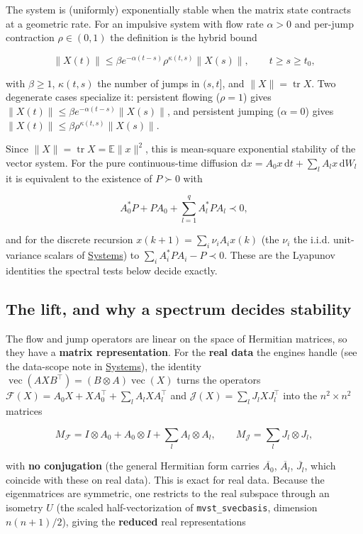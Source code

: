 \documentclass[11pt,oneside]{report}
\newcommand{\code}[1]{\texttt{#1}}
\begin{document}
The system is (uniformly) exponentially stable when the matrix state contracts
at a geometric rate. For an impulsive system with flow rate \(\alpha>0\) and
per-jump contraction \(\rho\in(0,1)\) the definition is the hybrid bound

\[\|X(t)\|\le\beta e^{-\alpha(t-s)} \rho^{ \kappa(t,s)} \|X(s)\|,\qquad t\ge s\ge t_0,\]

with \(\beta\ge1\), \(\kappa(t,s)\) the number of jumps in \((s,t]\), and
\(\|X\|=\operatorname{tr}X\). Two degenerate cases specialize it: persistent
flowing (\(\rho=1\)) gives \(\|X(t)\|\le\beta e^{-\alpha(t-s)}\|X(s)\|\), and
persistent jumping (\(\alpha=0\)) gives
\(\|X(t)\|\le\beta\rho^{\kappa(t,s)}\|X(s)\|\).

Since \(\|X\|=\operatorname{tr}X=\mathbb{E}\|x\|^{2}\), this is mean-square
exponential stability of the vector system. For the pure continuous-time
diffusion \(\mathrm{d}x=A_0x\,\mathrm{d}t+\sum_l A_l x\,\mathrm{d}W_l\) it is
equivalent to the existence of \(P\succ0\) with

\[A_0^{*}P+PA_0+\sum_{l=1}^{q}A_l^{*}P A_l\prec0,\]

and for the discrete recursion \(x(k{+}1)=\sum_i\nu_i A_i x(k)\) (the \(\nu_i\) the
i.i.d. unit-variance scalars of \protect\hyperlink{chap:02-systems}{Systems}) to
\(\sum_i A_i^{*}P A_i-P\prec0\). These are the Lyapunov identities the spectral
tests below decide exactly.

\hypertarget{the-lift-and-why-a-spectrum-decides-stability}{%
\subsection{The lift, and why a spectrum decides stability}\label{the-lift-and-why-a-spectrum-decides-stability}}

The flow and jump operators are linear on the space of Hermitian matrices, so
they have a \textbf{matrix representation}. For the \textbf{real data} the engines handle
(see the data-scope note in \protect\hyperlink{chap:02-systems}{Systems}), the identity
\(\operatorname{vec}(A X B^{\top})=(B\otimes A)\operatorname{vec}(X)\) turns the
operators \(\mathcal{F}(X)=A_0X+XA_0^{\top}+\sum_l A_l X A_l^{\top}\) and
\(\mathcal{J}(X)=\sum_l J_l X J_l^{\top}\) into the \(n^{2}\times n^{2}\) matrices

\[M_{\mathcal{F}}=I\otimes A_0+A_0\otimes I+\sum_{l}A_l\otimes A_l,\qquad M_{\mathcal{J}}=\sum_{l}J_l\otimes J_l,\]

with \textbf{no conjugation} (the general Hermitian form carries \(\overline{A_0}\),
\(\overline{A_l}\), \(\overline{J_l}\), which coincide with these on real data). This
is exact for real data. Because the eigenmatrices are symmetric, one restricts to
the real subspace through an isometry \(U\) (the scaled half-vectorization of
\code{mvst\_svecbasis}, dimension \(n(n+1)/2\)), giving the \textbf{reduced} real
representations
\end{document}
